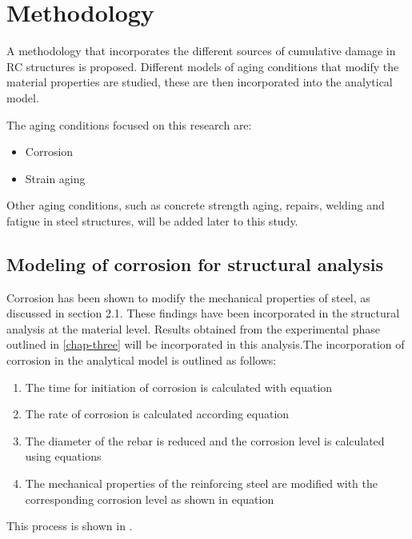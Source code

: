 \chapter{Methodology}
\label{chap-four}
A methodology that incorporates the different sources of cumulative damage in RC structures is proposed. Different models of aging conditions that modify the material properties are studied, these are then incorporated into the analytical model.

The aging conditions focused on this research are:
\begin{itemize}
	\item Corrosion
	\item Strain aging
\end{itemize}

Other aging conditions, such as concrete strength aging, repairs, welding and fatigue in steel structures,  will be added later to this study.

\section{Modeling of corrosion for structural analysis}

Corrosion has been shown to modify the mechanical properties of steel, as discussed in section 2.1. These findings have been incorporated in the structural analysis at the material level. Results obtained from the experimental phase outlined in \ref{chap-three} will be incorporated in this analysis.The incorporation of corrosion in the analytical model is outlined as follows:
\begin{enumerate}
	\item The time for initiation of corrosion is calculated with equation  
	\item The rate of corrosion is calculated according equation 
	\item The diameter of the rebar is reduced and the corrosion level is calculated using equations   
	\item The mechanical properties of the reinforcing steel are modified with the corresponding corrosion level as shown in equation 
\end{enumerate}

This process is shown in .

